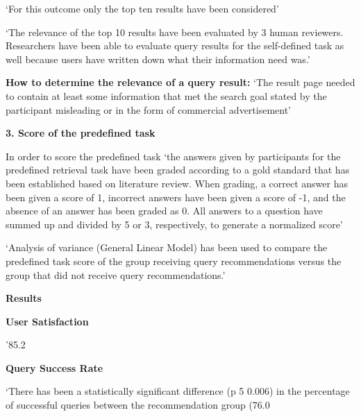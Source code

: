 \documentclass[]{article}
\begin{document}
‘For this outcome only the top ten results have been considered’

‘The relevance of the top 10 results have been evaluated by 3 human reviewers. Researchers have been able to evaluate query results for the self-defined task as well because users have written down what their information need was.’

\textbf{How to determine the relevance of a query result:} ‘The result page needed to contain at least some information that met the search goal stated by the participant misleading or in the form of commercial advertisement’

\textbf{3.	Score of the predefined task}

In order to score the predefined task ‘the answers given by participants for the predefined retrieval task have been graded according to a gold standard that has been established based on literature review. When grading, a correct answer has been given a score of 1, incorrect answers have been given a score of -1, and the absence of an answer has been graded as 0. All answers to a question have summed up and divided by 5 or 3, respectively, to generate a normalized score’

‘Analysis of variance (General Linear Model) has been used to compare the predefined task score of the group receiving query recommendations versus the group that did not receive query recommendations.’

\textbf{Results}

\textbf{User Satisfaction}

’85.2%

\textbf{Query Success Rate}

‘There has been a statistically significant difference (p 5 0.006) in the percentage of successful queries between the recommendation group (76.0%
\end{document}
